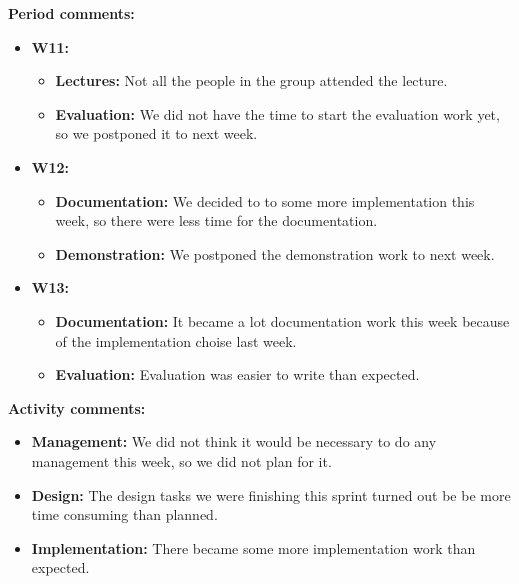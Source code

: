 \textbf{Period comments:}
\begin{itemize}
\item{}\textbf{W11:}
\begin{itemize}
\item{}\textbf{Lectures:} Not all the people in the group attended the lecture.
\item{}\textbf{Evaluation:} We did not have the time to start the evaluation work yet, so we postponed it to next week.
\end{itemize}
\item{}\textbf{W12:}
\begin{itemize}
\item{}\textbf{Documentation:} We decided to to some more implementation this week, so there were less time for the documentation.
\item{}\textbf{Demonstration:} We postponed the demonstration work to next week.
\end{itemize}
\item{}\textbf{W13:}
\begin{itemize}
\item{}\textbf{Documentation:} It became a lot documentation work this week because of the implementation choise last week.
\item{}\textbf{Evaluation:} Evaluation was easier to write than expected.
\end{itemize}
\end{itemize}

\textbf{Activity comments:}
\begin{itemize}
\item{}\textbf{Management:} We did not think it would be necessary to do any management this week, so we did not plan for it.
\item{}\textbf{Design:} The design tasks we were finishing this sprint turned out be be more time consuming than planned.
\item{}\textbf{Implementation:} There became some more implementation work than expected.
\end{itemize}
